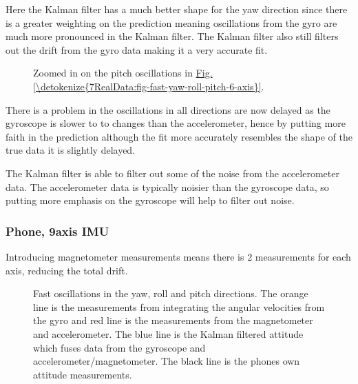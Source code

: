 \documentclass[letterpaper,10pt,english]{jupyterBook}
\begin{document}
\sphinxAtStartPar
Here the Kalman filter has a much better shape for the yaw direction since there is a greater weighting on the prediction meaning oscillations from the gyro are much more pronounced in the Kalman filter. The Kalman filter also still filters out the drift from the gyro data making it a very accurate fit.

\begin{figure}[htbp]
\centering
\capstart

\noindent{}
\caption{Zoomed in on the pitch oscillations in \hyperref[\detokenize{7RealData:fig-fast-yaw-roll-pitch-6-axis}]{Fig.\@ \ref{\detokenize{7RealData:fig-fast-yaw-roll-pitch-6-axis}}}.}\label{\detokenize{7RealData:fig-fast-yaw-roll-pitch-6-axis-zoomed}}\end{figure}

\sphinxAtStartPar
There is a problem in the oscillations in all directions are now delayed as the gyroscope is slower to to changes than the accelerometer, hence by putting more faith in the prediction although the fit more accurately resembles the shape of the true data it is slightly delayed.

\sphinxAtStartPar
The Kalman filter is able to filter out some of the noise from the accelerometer data. The accelerometer data is typically noisier than the gyroscope data, so putting more emphasis on the gyroscope will help to filter out noise.


\subsubsection{Phone, 9\sphinxhyphen{}axis IMU}
\label{\detokenize{7RealData:phone-9-axis-imu}}
\sphinxAtStartPar
Introducing magnetometer measurements means there is 2 measurements for each axis, reducing the total drift.

\begin{figure}[htbp]
\centering
\capstart

\noindent{}
\caption{Fast oscillations in the yaw, roll and pitch directions. The orange line is the measurements from integrating the angular velocities from the gyro and red line is the measurements from the magnetometer and accelerometer. The blue line is the Kalman filtered attitude which fuses data from the gyroscope and accelerometer/magnetometer.  The black line is the phones own attitude measurements.}\label{\detokenize{7RealData:fig-fast-yaw-roll-pitch}}\end{figure}
\end{document}
